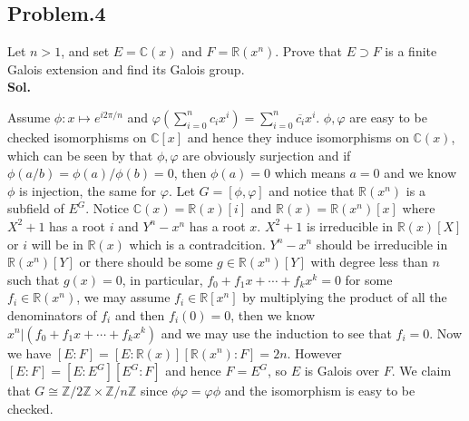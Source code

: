 \documentclass[lang=en,11pt,a4paper,citestyle =authoryear]{elegantpaper}
\begin{document}
\subsection*{Problem.4} 
Let $n>1$, and set $E=\mathbb{C}(x)$ and $F=\mathbb{R}(x^n)$. Prove that $E \supset F$ is a finite Galois extension and find its Galois group.
\vspace{0.5em}\\
\textbf{Sol.} \par
Assume $\phi:x\mapsto e^{i2\pi/n}$ and $\varphi(\sum\limits_{i=0}^nc_i x^i) = \sum\limits_{i=0}^n\overline{c_i} x^i$. $\phi,\varphi$ are easy to be checked isomorphisms on $\mathbb{C}[x]$ and hence they induce isomorphisms on $\mathbb{C}(x)$, which can be seen by that $\phi,\varphi$ are obviously surjection and if $\phi(a/b) = \phi(a)/\phi(b) =  0$, then $\phi(a) = 0$ which means $a = 0$ and we know $\phi$ is injection, the same for $\varphi$. Let $G = [\phi,\varphi]$ and notice that $\mathbb{R}(x^n)$ is a subfield of $E^G$. Notice $\mathbb{C}(x)= \mathbb{R}(x)[i]$ and $\mathbb{R}(x) = \mathbb{R}(x^n)[x]$ where $X^2 + 1$ has a root $i$ and $Y^n - x^n$ has a root $x$. $X^2+1$ is irreducible in $\mathbb{R}(x)[X]$ or $i$ will be in $\mathbb{R}(x)$ which is a contradcition. $Y^n - x^n$ should be irreducible in $\mathbb{R}(x^n)[Y]$ or there should be some $g\in \mathbb{R}(x^n)[Y]$ with degree less than $n$ such that $g(x) = 0$, in particular, $f_0 + f_1 x + \cdots + f_k x^k = 0$ for some $f_i \in \mathbb{R}(x^n)$, we may assume $f_i \in \mathbb{R}[x^n]$ by multiplying the product of all the denominators of $f_i$ and then $f_i(0) = 0$, then we know $x^n|(f_0 + f_1 x + \cdots + f_k x^k)$ and we may use the induction to see that $f_i = 0$. Now we have $[E:F] = [E:\mathbb{R}(x)][\mathbb{R}(x^n):F] = 2n$. However $[E:F] = [E:E^G][E^G:F]$ and hence $F = E^G$, so $E$ is Galois over $F$. We claim that $G \cong \mathbb{Z}/2\mathbb{Z} \times\mathbb{Z}/n\mathbb{Z}$ since $\phi\varphi = \varphi\phi$ and the isomorphism is easy to be checked.
\par 
\vspace{0.5em}
\end{document}
